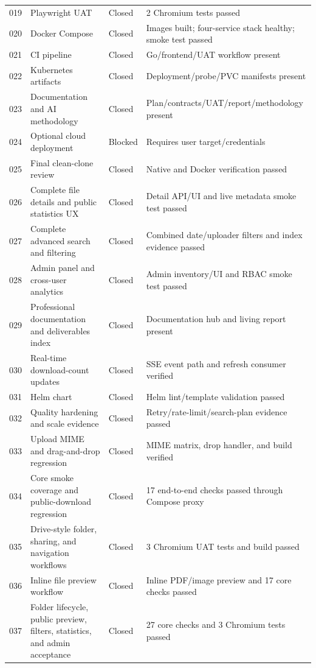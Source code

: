 \documentclass[11pt,a4paper]{article}
\begin{document}
\begin{longtable}{p{}p{}p{}p{}}
019 & Playwright UAT & Closed & 2 Chromium tests passed \\
020 & Docker Compose & Closed & Images built; four-service stack healthy; smoke test passed \\
021 & CI pipeline & Closed & Go/frontend/UAT workflow present \\
022 & Kubernetes artifacts & Closed & Deployment/probe/PVC manifests present \\
023 & Documentation and AI methodology & Closed & Plan/contracts/UAT/report/methodology present \\
024 & Optional cloud deployment & Blocked & Requires user target/credentials \\
025 & Final clean-clone review & Closed & Native and Docker verification passed \\
026 & Complete file details and public statistics UX & Closed & Detail API/UI and live metadata smoke test passed \\
027 & Complete advanced search and filtering & Closed & Combined date/uploader filters and index evidence passed \\
028 & Admin panel and cross-user analytics & Closed & Admin inventory/UI and RBAC smoke test passed \\
029 & Professional documentation and deliverables index & Closed & Documentation hub and living report present \\
030 & Real-time download-count updates & Closed & SSE event path and refresh consumer verified \\
031 & Helm chart & Closed & Helm lint/template validation passed \\
032 & Quality hardening and scale evidence & Closed & Retry/rate-limit/search-plan evidence passed \\
033 & Upload MIME and drag-and-drop regression & Closed & MIME matrix, drop handler, and build verified \\
034 & Core smoke coverage and public-download regression & Closed & 17 end-to-end checks passed through Compose proxy \\
035 & Drive-style folder, sharing, and navigation workflows & Closed & 3 Chromium UAT tests and build passed \\
036 & Inline file preview workflow & Closed & Inline PDF/image preview and 17 core checks passed \\
037 & Folder lifecycle, public preview, filters, statistics, and admin acceptance & Closed & 27 core checks and 3 Chromium tests passed \\
\bottomrule
\end{longtable}
\end{document}
